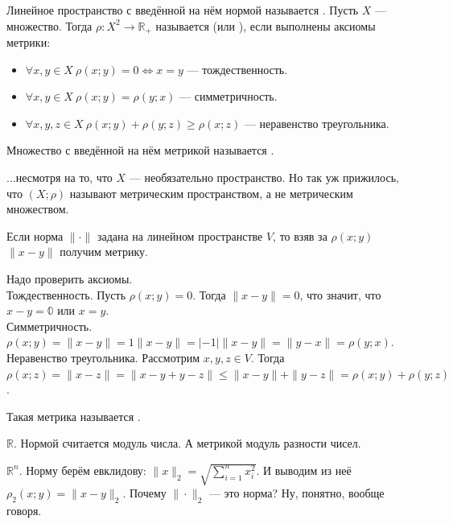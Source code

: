 \documentclass{article}
\begin{document}
\begin{itemize}
\begin{Proof}
        \end{Proof}
        \dfn Линейное пространство с введённой на нём нормой называется .
        \dfn Пусть $X$ --- множество. Тогда $\rho\colon X^2\to\mathbb R_+$ называется  (или ), если выполнены аксиомы метрики:
        \begin{itemize}
            \item $\forall x,y\in X~\rho(x;y)=0\Leftrightarrow x=y$ --- тождественность.
            \item $\forall x,y\in X~\rho(x;y)=\rho(y;x)$ --- симметричность.
            \item $\forall x,y,z\in X~\rho(x;y)+\rho(y;z)\geqslant\rho(x;z)$ --- неравенство треугольника.
        \end{itemize}
        \dfn Множество с введённой на нём метрикой называется .
        \begin{Comment}
            ...несмотря на то, что $X$ --- необязательно пространство. Но так уж прижилось, что $(X;\rho)$ называют метрическим пространством, а не метрическим множеством.
        \end{Comment}
        \thm Если норма $\|\cdot\|$ задана на линейном пространстве $V$, то взяв за $\rho(x;y)$ $\|x-y\|$ получим метрику.
        \begin{Proof}
            Надо проверить аксиомы.\\
            Тождественность. Пусть $\rho(x;y)=0$. Тогда $\|x-y\|=0$, что значит, что $x-y=\mathbb0$ или $x=y$.\\
            Симметричность. $\rho(x;y)=\|x-y\|=1\|x-y\|=|-1|\|x-y\|=\|y-x\|=\rho(y;x)$.\\
            Неравенство треугольника. Рассмотрим $x,y,z\in V$. Тогда $\rho(x;z)=\|x-z\|=\|x-y+y-z\|\leqslant\|x-y\|+\|y-z\|=\rho(x;y)+\rho(y;z)$.
        \end{Proof}
        \dfn Такая метрика называется .
        \begin{Example}
            $\mathbb R$. Нормой считается модуль числа. А метрикой модуль разности чисел.
        \end{Example}
        \begin{Example}
            $\mathbb R^n$. Норму берём евклидову: $\|x\|_2=\sqrt{\sum\limits_{i=1}^nx_i^2}$. И выводим из неё $\rho_2(x;y)=\|x-y\|_2$. Почему $\|\cdot\|_2$ --- это норма? Ну, понятно, вообще говоря.\\

\end{Example}
\end{itemize}
\end{document}
